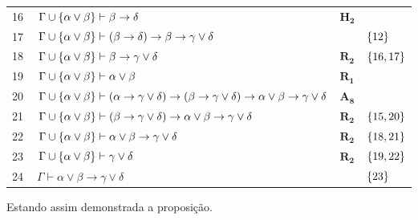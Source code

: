 \begin{tcolorbox}[enhanced jigsaw, breakable, sharp corners, colframe=black, colback=white, boxrule=0.5pt, left=1.5mm, right=1.5mm, top=1.5mm, bottom=1.5mm]
\begin{xltabular}{\textwidth}{r | X l l}
            \scriptsize{16}\phantom{ }           & $\ \Gamma\cup\set{\alpha\vee\beta}\vdash\beta\to\delta$                                                                                 & $\mathbf{H_2}$                                     & \\[\rowskip]
            \scriptsize{17}\phantom{ }           & $\ \Gamma\cup\set{\alpha\vee\beta}\vdash(\beta\to\delta)\to\beta\to\gamma\vee\delta$                                                    &                                & $\left\{12\right\}$\\[\rowskip]
            \scriptsize{18}\phantom{ }           & $\ \Gamma\cup\set{\alpha\vee\beta}\vdash\beta\to\gamma\vee\delta$                                                                       & $\hyperref[modal.rule.2]{\mathbf{R_2}}$            & $\left\{16,17\right\}$\\[\rowskip]
            \scriptsize{19}\phantom{ }           & $\ \Gamma\cup\set{\alpha\vee\beta}\vdash\alpha\vee\beta$                                                                                & $\hyperref[modal.rule.1]{\mathbf{R_1}}$            & \\[\rowskip]
            \scriptsize{20}\phantom{ }           & $\ \Gamma\cup\set{\alpha\vee\beta}\vdash(\alpha\to\gamma\vee\delta)\to(\beta\to\gamma\vee\delta)\to\alpha\vee\beta\to\gamma\vee\delta$  & $\hyperref[modal.axiom.8]{\mathbf{A_8}}$           & \\[\rowskip]
            \scriptsize{21}\phantom{ }           & $\ \Gamma\cup\set{\alpha\vee\beta}\vdash(\beta\to\gamma\vee\delta)\to\alpha\vee\beta\to\gamma\vee\delta$                                & $\hyperref[modal.rule.2]{\mathbf{R_2}}$            & $\left\{15,20\right\}$\\[\rowskip]
            \scriptsize{22}\phantom{ }           & $\ \Gamma\cup\set{\alpha\vee\beta}\vdash\alpha\vee\beta\to\gamma\vee\delta$                                                             & $\hyperref[modal.rule.2]{\mathbf{R_2}}$            & $\left\{18,21\right\}$\\[\rowskip]
            \scriptsize{23}\phantom{ }           & $\ \Gamma\cup\set{\alpha\vee\beta}\vdash\gamma\vee\delta$                                                                               & $\hyperref[modal.rule.2]{\mathbf{R_2}}$            & $\left\{19,22\right\}$\\[\rowskip]
            \scriptsize{24}\phantom{ }           & $\ \Gamma\vdash\alpha\vee\beta\to\gamma\vee\delta$                                                                                      &                                & $\left\{23\right\}$
        \end{xltabular}
        \normalsize

        \vspace{\baselineskip}
        Estando assim demonstrada a proposição.
\end{tcolorbox}

